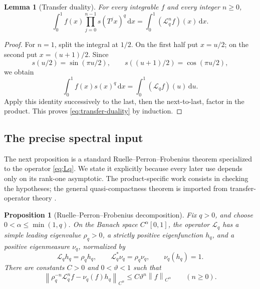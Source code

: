 \documentclass[11pt,oneside]{article}
\numberwithin{equation}{section}
\newtheorem{proposition}[theorem]{Proposition}
\newtheorem{lemma}[theorem]{Lemma}
\theoremstyle{definition}
\theoremstyle{remark}
\newcommand{\dd}{\,\mathrm d}
\newcommand{\norm}[1]{\left\lVert#1\right\rVert}
\newcommand{\Transfer}{\mathcal L}
\begin{document}
\begin{lemma}[Transfer duality]
\label{lem:transfer-duality}
For every integrable \(f\) and every integer \(n\ge0\),
\begin{equation}
 \int_0^1 f(x)\prod_{j=0}^{n-1}s(T^jx)^q\dd x
 =\int_0^1(\Transfer_q^nf)(x)\dd x.
 \label{eq:transfer-duality}
\end{equation}
\end{lemma}

\begin{proof}
For \(n=1\), split the integral at \(1/2\).  On the first half put \(x=u/2\); on the
second put \(x=(u+1)/2\).  Since
\[
 s(u/2)=\sin(\pi u/2),
 \qquad s((u+1)/2)=\cos(\pi u/2),
\]
we obtain
\[
 \int_0^1f(x)s(x)^q\dd x=\int_0^1(\Transfer_qf)(u)\dd u.
\]
Apply this identity successively to the last, then the next-to-last, factor in the product.
This proves \eqref{eq:transfer-duality} by induction.
\end{proof}

\subsection{The precise spectral input}

The next proposition is a standard Ruelle--Perron--Frobenius theorem specialized to the
operator \eqref{eq:Lq}.  We state it explicitly because every later use depends only on its
rank-one asymptotic.  The product-specific work consists in checking the hypotheses; the
general quasi-compactness theorem is imported from transfer-operator theory
\cite{baladi,fan1997}.

\begin{proposition}[Ruelle--Perron--Frobenius decomposition]
\label{prop:RPF}
Fix \(q>0\), and choose \(0<\alpha\le\min(1,q)\).  On the Banach space
\(C^\alpha[0,1]\), the operator \(\Transfer_q\) has a simple leading eigenvalue
\(\rho_q>0\), a strictly positive eigenfunction \(h_q\), and a positive eigenmeasure
\(\nu_q\), normalized by
\begin{equation}
 \Transfer_qh_q=\rho_qh_q,
 \qquad
 \Transfer_q^*\nu_q=\rho_q\nu_q,
 \qquad
 \nu_q(h_q)=1.
 \label{eq:RPF-eigen}
\end{equation}
There are constants \(C>0\) and \(0<\vartheta<1\) such that
\begin{equation}
 \norm{\rho_q^{-n}\Transfer_q^nf-\nu_q(f)h_q}_{C^\alpha}
 \le C\vartheta^n\norm f_{C^\alpha}
 \qquad(n\ge0).
 \label{eq:RPF-gap}
\end{equation}
\end{proposition}
\end{document}
